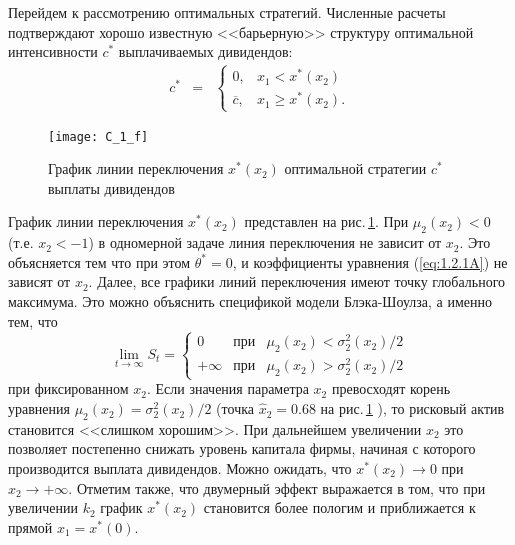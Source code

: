 Перейдем к рассмотрению оптимальных стратегий. Численные расчеты подтверждают хорошо известную <<барьерную>> структуру оптимальной интенсивности $c^*$ выплачиваемых дивидендов:
\begin{equation}
 \begin{matrix}
c^* & = & \left \{
\begin{matrix} 0,& x_1< x^*(x_2) \\
               \overline c,& x_1 \ge x^*(x_2).
\end{matrix}\right.
\end{matrix}
\end{equation}
\begin{figure}[h]
        \centering
          \texttt{[image: C\_1\_f]}
         \caption{График линии переключения $x^*(x_2)$ оптимальной стратегии $c^*$ выплаты дивидендов}
          \label{fig:1.2}
\end{figure}

График линии переключения $x^*(x_2)$ представлен на рис.\,\ref{fig:1.2}. При $\mu_2(x_2)<0$ (т.е. $x_2<-1$) в одномерной задаче линия переключения не зависит от $x_2$. Это объясняется тем что при этом $\theta^*=0$, и коэффициенты уравнения  (\ref{eq:1.2.1A}) не зависят от $x_2$. Далее, все графики линий переключения имеют точку глобального максимума.
Это можно объяснить спецификой модели Блэка-Шоулза, а именно тем, что
$$ \lim_{t\to\infty} S_t=\left\{\begin{matrix}
  0 &\text{при}& \mu_2(x_2)<\sigma_2^2(x_2)/2\\
  +\infty&\text{при}& \mu_2(x_2)>\sigma_2^2(x_2)/2
 \end{matrix}\right.
$$
при фиксированном $x_2$. Если значения параметра $x_2$ превосходят корень уравнения $\mu_2(x_2)=\sigma_2^2(x_2)/2$ (точка $\widehat x_2=0.68$ на рис.\,\ref{fig:1.2} ), то рисковый актив становится <<слишком хорошим>>. При дальнейшем увеличении $x_2$ это позволяет постепенно снижать уровень капитала фирмы, начиная с которого производится выплата дивидендов. Можно ожидать, что $x^*(x_2)\to 0$ при $x_2 \to +\infty$. Отметим также, что двумерный эффект выражается в том, что при увеличении $k_2$ график $x^*(x_2)$ становится более пологим и приближается к прямой $x_1=x^*(0)$.

